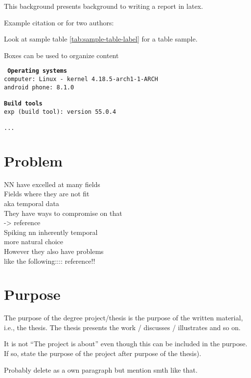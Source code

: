 This background presents background to writing a report in latex.


Example citation \cite{Jones2017} or for two authors: \cite{Jones2017, Liu2017}

Look at sample table \ref{tab:sample-table-label} for a table sample.



Boxes can be used to organize content

\begin{tcolorbox}[title={Development environment for prototype}]
	\tt{
		\textbf{Operating systems }\\
		computer: Linux - kernel 4.18.5-arch1-1-ARCH\\
		android phone: 8.1.0\\
		~\\
		\textbf{Build tools}\\
		exp (build tool): version 55.0.4\\
		~\\
		...
	}
\end{tcolorbox}

\section{Problem}
NN have excelled at many fields\\
Fields where they are not fit\\ aka temporal data\\
They have ways to compromise on that \\ -> reference\\
Spiking nn inherently temporal \\
more natural choice\\
However they also have problems\\
like the following:::: reference!!\\
\section{Purpose}
The purpose of the degree project/thesis is the purpose of the written material, i.e., the thesis. The thesis presents the work / discusses / illustrates and so on.

It is not “The project is about” even though this can be included in the purpose. If so, state the purpose of the project after purpose of the thesis).

Probably delete as a own paragraph but mention smth like that.

